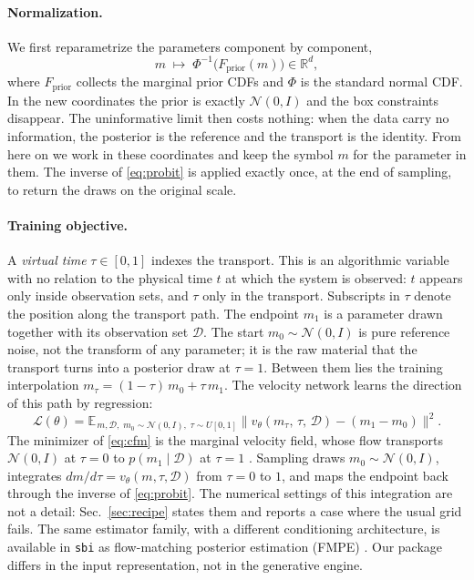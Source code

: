 \documentclass[10pt]{article}
\newcommand{\D}{\mathcal{D}}
\newcommand{\R}{\mathbb{R}}
\newcommand{\E}{\mathbb{E}}
\newcommand{\N}{\mathcal{N}}
\begin{document}
\paragraph{Normalization.} We first reparametrize the parameters component by component,
\begin{equation}
  m \;\longmapsto\; \Phi^{-1}\!\bigl(F_{\text{prior}}(m)\bigr) \in \R^{d},
  \label{eq:probit}
\end{equation}
where $F_{\text{prior}}$ collects the marginal prior CDFs and $\Phi$ is the standard normal CDF. In
the new coordinates the prior is exactly $\N(0, I)$ and the box constraints disappear. The
uninformative limit then costs nothing: when the data carry no information, the posterior is the
reference and the transport is the identity. From here on we work in these coordinates and keep the
symbol $m$ for the parameter in them. The inverse of \eqref{eq:probit} is applied exactly once, at the
end of sampling, to return the draws on the original scale.

\paragraph{Training objective.} A \emph{virtual time} $\tau \in [0, 1]$ indexes the transport. This is
an algorithmic variable with no relation to the physical time $t$ at which the system is observed:
$t$ appears only inside observation sets, and $\tau$ only in the transport. Subscripts in $\tau$
denote the position along the transport path. The endpoint $m_1$ is a parameter drawn together with
its observation set $\D$. The start $m_0 \sim \N(0, I)$ is pure reference noise, not the transform of
any parameter; it is the raw material that the transport turns into a posterior draw at $\tau = 1$.
Between them lies the training interpolation $m_\tau = (1 - \tau)\, m_0 + \tau\, m_1$. The velocity
network learns the direction of this path by regression:
\begin{equation}
  \mathcal{L}(\theta) =
  \E_{\,m,\D,\; m_0 \sim \N(0,I),\; \tau \sim U[0,1]}
  \bigl\| v_\theta(m_\tau,\, \tau,\, \D) - (m_1 - m_0) \bigr\|^2 .
  \label{eq:cfm}
\end{equation}
The minimizer of \eqref{eq:cfm} is the marginal velocity field, whose flow transports $\N(0, I)$ at
$\tau = 0$ to $p(m_1 \mid \D)$ at $\tau = 1$ \citep{lipman2023}. Sampling draws $m_0 \sim \N(0, I)$,
integrates $dm/d\tau = v_\theta(m, \tau, \D)$ from $\tau = 0$ to $1$, and maps the endpoint back
through the inverse of \eqref{eq:probit}. The numerical settings of this integration are not a detail:
Sec.~\ref{sec:recipe} states them and reports a case where the usual grid fails. The same estimator
family, with a different conditioning architecture, is available in \texttt{sbi} as flow-matching
posterior estimation (FMPE) \citep{wildberger2023}. Our package differs in the input representation,
not in the generative engine.
\end{document}
